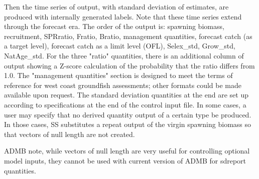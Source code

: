 Then the time series of output, with standard deviation of estimates, are produced with internally generated labels.  Note that these time series extend through the forecast era.  The order of the output is: spawning biomass, recruitment, SPRratio, Fratio, Bratio, management quantities, forecast catch (as a target level), forecast catch as a limit level (OFL), Selex\_std, Grow\_std, NatAge\_std.  For the three "ratio" quantities, there is an additional column of output showing a Z-score calculation of the probability that the ratio differs from 1.0. The "management quantities" section is designed to meet the terms of reference for west coast groundfish assessments; other formats could be made available upon request. The standard deviation quantities at the end are set up according to specifications at the end of the control input file. In some cases, a user may specify that no derived quantity output of a certain type be produced. In those cases, SS substitutes a repeat output of the virgin spawning biomass so that vectors of null length are not created.

ADMB note, while vectors of null length are very useful for controlling optional model inputs, they cannot be used with current version of ADMB for sdreport quantities.

